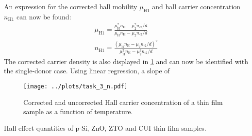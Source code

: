 An expression for the corrected hall mobility $\mu_{\mathrm{H} 1}$ and  
hall carrier concentration $n_{\mathrm{H}1}$ can now 
be found:
\begin{align}
	\mu_{\mathrm{H} 1}=\frac{\mu_{\mathrm{H}}^{2} n_{\mathrm{H}}- \mu_{2} ^{2} 
	n_{ \square 2} /d}{\mu_{\mathrm{H}} n_{\mathrm{H}} - \mu_{2} n_{\square 2} / d} \\
	n_{\mathrm{H}1} = \frac{(\mu_{\mathrm{H}}n_{\mathrm{H}}-\mu_{2}n_{\square 2} 
	/ d)^{2}}{\mu_{\mathrm{H}}^{2}n_{\mathrm{H}}-\mu_{2}^{2} n_{\square 2} / d}	
\end{align}
The corrected carrier density is also displayed in \cref{zno_hall_n} and can
now be identified with the single-donor case.
Using linear regression, a slope of 






\begin{figure}
	\centering
	\texttt{[image: ../plots/task\_3\_n.pdf]}
	\caption{Corrected and uncorrected Hall carrier concentration of a  thin 
	film sample as a function of temperature.}
	\label{zno_hall_n}
\end{figure}

\begin{table*}
\centering

\caption{Hall effect quantities of p-Si, ZnO, ZTO and CUI thin film samples.}
\label{tab:hall_results_detail}
\end{table*}
